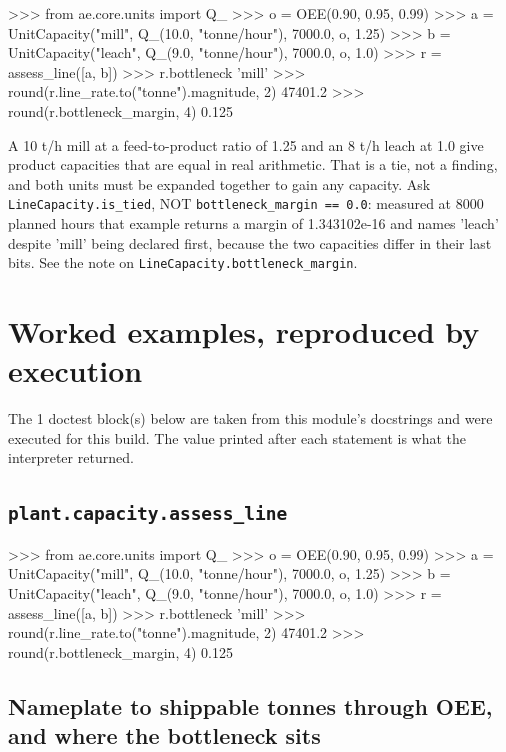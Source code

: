 \documentclass[10pt,a4paper,twoside]{report}
\begin{document}
\begin{doctestblock}
>>> from ae.core.units import Q_
>>> o = OEE(0.90, 0.95, 0.99)
>>> a = UnitCapacity("mill", Q_(10.0, "tonne/hour"), 7000.0, o, 1.25)
>>> b = UnitCapacity("leach", Q_(9.0, "tonne/hour"), 7000.0, o, 1.0)
>>> r = assess_line([a, b])
>>> r.bottleneck
'mill'
>>> round(r.line_rate.to("tonne").magnitude, 2)
47401.2
>>> round(r.bottleneck_margin, 4)
0.125
\end{doctestblock}

A 10 t/h mill at a feed-to-product ratio of 1.25 and an 8 t/h leach at 1.0 give product capacities that are equal in real arithmetic. That is a tie, not a finding, and both units must be expanded together to gain any capacity. Ask \texttt{LineCapacity.is\_tied}, NOT \texttt{bottleneck\_margin == 0.0}: measured at 8000 planned hours that example returns a margin of 1.343102e-16 and names 'leach' despite 'mill' being declared first, because the two capacities differ in their last bits. See the note on \texttt{LineCapacity.bottleneck\_margin}.

\section{Worked examples, reproduced by execution}

The 1 doctest block(s) below are taken from this module's docstrings and were executed for this build. The value printed after each statement is what the interpreter returned.

\subsection*{\texttt{plant.capacity.assess\_line}}

\begin{doctestblock}
>>> from ae.core.units import Q_
>>> o = OEE(0.90, 0.95, 0.99)
>>> a = UnitCapacity("mill", Q_(10.0, "tonne/hour"), 7000.0, o, 1.25)
>>> b = UnitCapacity("leach", Q_(9.0, "tonne/hour"), 7000.0, o, 1.0)
>>> r = assess_line([a, b])
>>> r.bottleneck
'mill'
>>> round(r.line_rate.to("tonne").magnitude, 2)
47401.2
>>> round(r.bottleneck_margin, 4)
0.125
\end{doctestblock}

\subsection*{Nameplate to shippable tonnes through OEE, and where the bottleneck sits}
\end{document}
